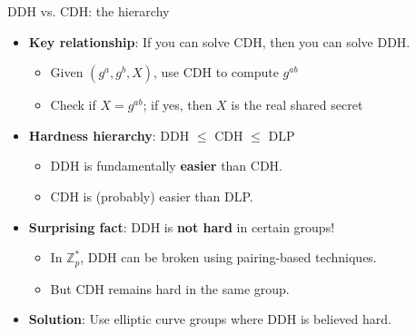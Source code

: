 \documentclass[aspectratio=169, lualatex, handout]{beamer}
\begin{document}
\begin{frame}{DDH vs. CDH: the hierarchy}
	\begin{itemize}[<+->]
		\item \textbf{Key relationship}: If you can solve CDH, then you can solve DDH.
		      \begin{itemize}
			      \item Given $(g^a, g^b, X)$, use CDH to compute $g^{ab}$
			      \item Check if $X = g^{ab}$; if yes, then $X$ is the real shared secret
		      \end{itemize}
		\item \textbf{Hardness hierarchy}: DDH $\leq$ CDH $\leq$ DLP
		      \begin{itemize}
			      \item DDH is fundamentally \textbf{easier} than CDH.
			      \item CDH is (probably) easier than DLP.
		      \end{itemize}
		\item \textbf{Surprising fact}: DDH is \textbf{not hard} in certain groups!
		      \begin{itemize}
			      \item In $\mathbb{Z}_p^*$, DDH can be broken using pairing-based techniques.
			      \item But CDH remains hard in the same group.
		      \end{itemize}
		\item \textbf{Solution}: Use elliptic curve groups where DDH is believed hard.
	\end{itemize}
\end{frame}
\end{document}
